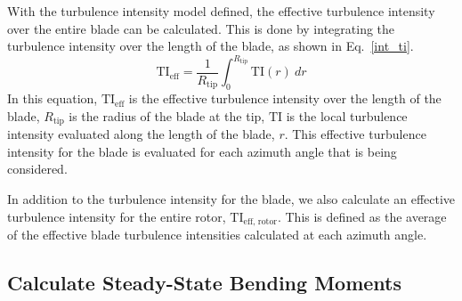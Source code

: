 \documentclass[11pt,letterpaper]{article}
\begin{document}
With the turbulence intensity model defined, the effective turbulence intensity over the entire blade can be calculated. This is done by integrating the turbulence intensity over the length of the blade, as shown in Eq.~\ref{int_ti}.
%
\begin{equation}
    \label{int_ti}
    \text{TI}_{\text{eff}} = \frac{1}{R_{\text{tip}}}\int_0^{R_\text{tip}} \text{TI}(r)~dr
\end{equation}
%
In this equation, $\text{TI}_{\text{eff}}$ is the effective turbulence intensity over the length of the blade, $R_{\text{tip}}$ is the radius of the blade at the tip, $\text{TI}$ is the local turbulence intensity evaluated along the length of the blade, $r$. This effective turbulence intensity for the blade is evaluated for each azimuth angle that is being considered.

In addition to the turbulence intensity for the blade, we also calculate an effective turbulence intensity for the entire rotor, $\text{TI}_{\text{eff, rotor}}$. This is defined as the average of the effective blade turbulence intensities calculated at each azimuth angle.

\subsection{Calculate Steady-State Bending Moments}
\end{document}
